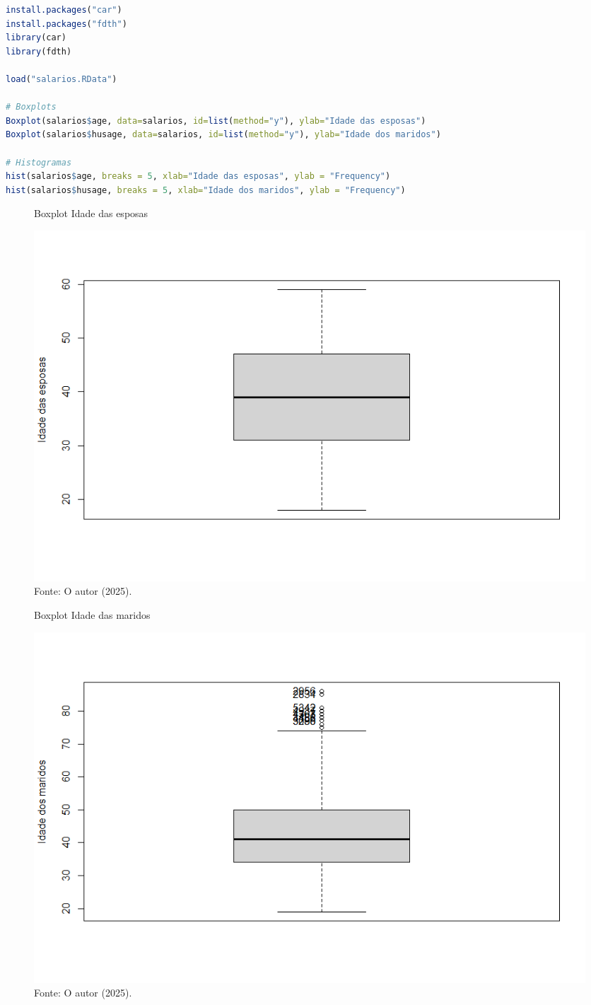 \begin{lstlisting}[language=R, style=input]
install.packages("car")
install.packages("fdth")
library(car)
library(fdth)

load("salarios.RData")

# Boxplots
Boxplot(salarios$age, data=salarios, id=list(method="y"), ylab="Idade das esposas")
Boxplot(salarios$husage, data=salarios, id=list(method="y"), ylab="Idade dos maridos")

# Histogramas
hist(salarios$age, breaks = 5, xlab="Idade das esposas", ylab = "Frequency")
hist(salarios$husage, breaks = 5, xlab="Idade dos maridos", ylab = "Frequency")
\end{lstlisting}
\begin{figure}[H]
\centering
\caption{Boxplot Idade das esposas}
\includegraphics[width=1\linewidth]{apendices/fig/4_IAA004_1.png}
\caption*{Fonte: O autor (2025).}
\end{figure}
\begin{figure}[H]
\centering
\caption{Boxplot Idade das maridos}
\includegraphics[width=1\linewidth]{apendices/fig/4_IAA004_2.png}
\caption*{Fonte: O autor (2025).}
\end{figure}
